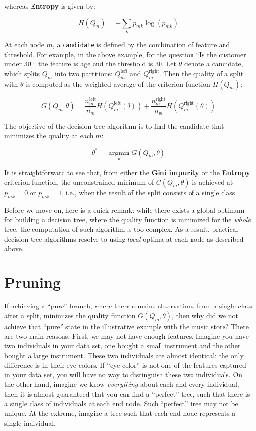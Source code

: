 \documentclass[
]{book}
\theoremstyle{definition}
\theoremstyle{definition}
\theoremstyle{definition}
\theoremstyle{definition}
\theoremstyle{remark}
\begin{document}
whereas \textbf{Entropy} is given by:

\[H(Q_m)=-\sum_{k}{p_{mk}\log{(p_{mk})}}\]

At each node \(m\), a \texttt{candidate} is defined by the combination of feature and threshold. For example, in the above example, for the question ``Is the customer under 30,'' the feature is age and the threshold is 30. Let \(\theta\) denote a candidate, which splits \(Q_m\) into two partitions: \(Q_m^{\text{left}}\) and \(Q_m^{\text{right}}\). Then the quality of a split with \(\theta\) is computed as the weighted average of the criterion function \(H(Q_m)\):

\[G(Q_m, \theta) = \frac{n_m^{\text{left}}}{n_m}H(Q_m^{\text{left}}(\theta)) + \frac{n_m^{\text{right}}}{n_m}H(Q_m^{\text{right}}(\theta))\]

The objective of the decision tree algorithm is to find the candidate that minimizes the quality at each \(m\):

\[\theta^{*} = \underset{\theta}{\operatorname{argmin}}{G(Q_m, \theta)}\]

It is straightforward to see that, from either the \textbf{Gini impurity} or the \textbf{Entropy} criterion function, the unconstrained minimum of \(G(Q_m, \theta)\) is achieved at \(p_{mk}=0\) or \(p_{mk}=1\), i.e., when the result of the split consists of a single class.

Before we move on, here is a quick remark: while there exists a global optimum for building a decision tree, where the quality function is minimized for the \emph{whole} tree, the computation of such algorithm is too complex. As a result, practical decision tree algorithms resolve to using \emph{local} optima at each node as described above.

\hypertarget{pruning}{%
\section{Pruning}\label{pruning}}

If achieving a ``pure'' branch, where there remains observations from a single class after a split, minimizes the quality function \(G(Q_m, \theta)\), then why did we not achieve that ``pure'' state in the illustrative example with the music store? There are two main reasons. First, we may not have enough features. Imagine you have two individuals in your data set, one bought a small instrument and the other bought a large instrument. These two individuals are almost identical: the only difference is in their eye colors. If ``eye color'' is not one of the features captured in your data set, you will have no way to distinguish these two individuals. On the other hand, imagine we know \emph{everything} about each and every individual, then it is almost guaranteed that you can find a ``perfect'' tree, such that there is a single class of individuals at each end node. Such ``perfect'' tree may not be unique. At the extreme, imagine a tree such that each end node represents a single individual.
\end{document}
